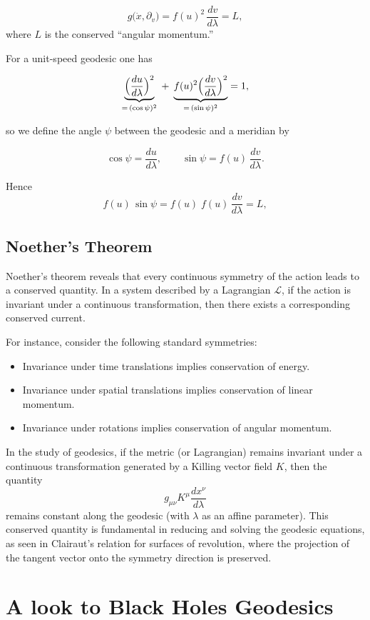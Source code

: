 \documentclass[12pt]{article}
\begin{document}
$$
g\bigl(\dot x,\partial_v\bigr)
= f(u)^2\,\frac{dv}{d\lambda}
= L,
$$
where $L$ is the conserved “angular momentum.”

For a unit-speed geodesic one has

$$
\underbrace{\Bigl(\frac{du}{d\lambda}\Bigr)^2}_{=\,(\cos\psi)^2}
\;+\;
\underbrace{f(u)^2\Bigl(\frac{dv}{d\lambda}\Bigr)^2}_{=\,(\sin\psi)^2}
=1,
$$

so we define the angle $\psi$ between the geodesic and a meridian by

$$
\cos\psi = \frac{du}{d\lambda},
\qquad
\sin\psi = f(u)\,\frac{dv}{d\lambda}.
$$

Hence
$$
f(u)\,\sin\psi
= f(u)\;f(u)\,\frac{dv}{d\lambda}
= L,
$$

\subsection{Noether's Theorem}
Noether's theorem reveals that every continuous symmetry of the action leads to a conserved quantity. 
In a system described by a Lagrangian \( \mathcal{L} \), if the action is invariant under a continuous transformation, then there exists a corresponding conserved current.

For instance, consider the following standard symmetries:
\begin{itemize}
    \item Invariance under time translations implies conservation of energy.
    \item Invariance under spatial translations implies conservation of linear momentum.
    \item Invariance under rotations implies conservation of angular momentum.
\end{itemize}

In the study of geodesics, if the metric (or Lagrangian) remains invariant under a continuous transformation generated by a Killing vector field \( K \), then the quantity
\[
    g_{\mu\nu}K^{\mu}\frac{dx^{\nu}}{d\lambda}
\]
remains constant along the geodesic (with \( \lambda \) as an affine parameter). 
This conserved quantity is fundamental in reducing and solving the geodesic equations, as seen in Clairaut's relation for surfaces of revolution, where the projection of the tangent vector onto the symmetry direction is preserved.

\section{A look to Black Holes Geodesics}
\end{document}

